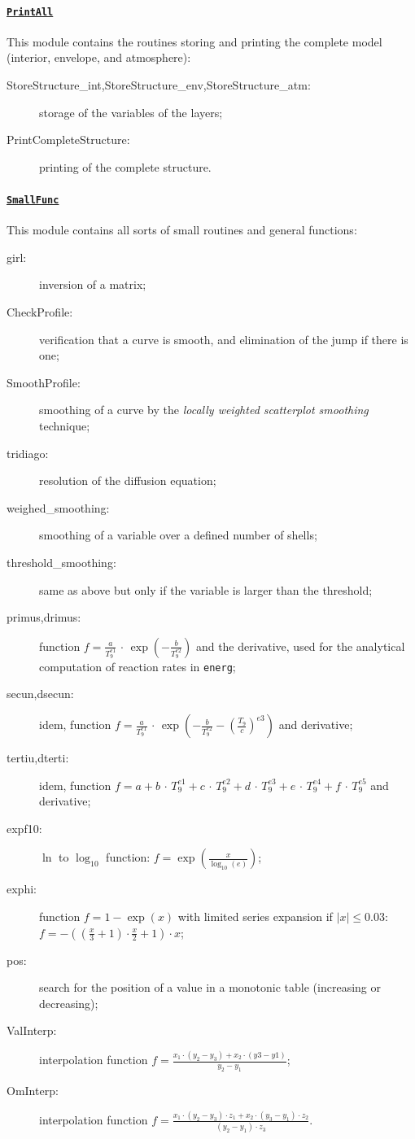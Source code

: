 \documentclass[11pt]{article}
\begin{document}
\paragraph{\underline{\texttt{PrintAll}}}
This module contains the routines storing and printing the complete model (interior, envelope, and atmosphere):

\begin{description}
 \item[StoreStructure\_int,StoreStructure\_env,StoreStructure\_atm:] storage of the variables of the layers;
 \item[PrintCompleteStructure:] printing of the complete structure.
\end{description}

\paragraph{\underline{\texttt{SmallFunc}}}
This module contains all sorts of small routines and general functions:

\begin{description}
 \item[girl:] inversion of a matrix;
 \item[CheckProfile:] verification that a curve is smooth, and elimination of the jump if there is one;
 \item[SmoothProfile:] smoothing of a curve by the \textit{locally weighted scatterplot smoothing} technique;
 \item[tridiago:] resolution of the diffusion equation;
 \item[weighed\_smoothing:] smoothing of a variable over a defined number of shells;
 \item[threshold\_smoothing:] same as above but only if the variable is larger than the threshold;
 \item[primus,drimus:] function $f=\frac{a}{T_9^{e1}}\,\cdot\,\exp(-\frac{b}{T_9^{e2}})$ and the derivative, used for the analytical computation of reaction rates in \texttt{energ};
 \item[secun,dsecun:] idem, function $f=\frac{a}{T_9^{e1}}\,\cdot\,\exp\left(-\frac{b}{T_9^{e2}}-\left(\frac{T_9}{c}\right)^{e3}\right)$ and derivative;
 \item[tertiu,dterti:] idem, function $f=a+b\,\cdot\,T_9^{e1}+c\,\cdot\,T_9^{e2}+d\,\cdot\,T_9^{e3}+e\,\cdot\,T_9^{e4}+f\,\cdot\,T_9^{e5}$ and derivative;
 \item[expf10:] $\ln$ to $\log_{10}$ function: $f=\exp\left(\frac{x}{\log_{10}(e)}\right)$;
 \item[exphi:] function $f=1-\exp(x)$ with limited series expansion if $|x| \leq 0.03$: $f=-\left(\left(\frac{x}{3} + 1 \right)\cdot\frac{x}{2} + 1\right)\cdot x$;
 \item[pos:] search for the position of a value in a monotonic table (increasing or decreasing);
 \item[ValInterp:] interpolation function $f=\frac{x_1\cdot(y_2-y_3)+x_2\cdot(y3-y1)}{y_2-y_1}$;
 \item[OmInterp:] interpolation function $f=\frac{x_1\cdot(y_2-y_3)\cdot z_1+x_2\cdot(y_3-y_1)\cdot z_2}{(y_2-y_1)\cdot z_3}$.
 \end{description}
\end{document}

